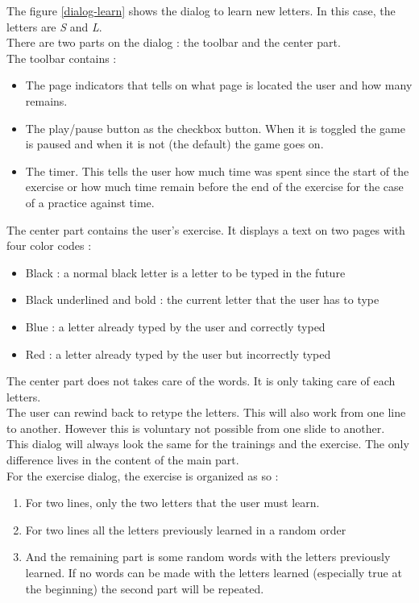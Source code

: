 The figure \ref{dialog-learn} shows the dialog to learn new letters. In this case, the letters are \textit{S} and \textit{L}.\\
There are two parts on the dialog : the toolbar and the center part.\\
The toolbar contains :
\begin{itemize}
	\item The page indicators that tells on what page is located the user and how many remains.
	\item The play/pause button as the checkbox button. When it is toggled the game is paused and when it is not (the default) the game goes on.
	\item The timer. This tells the user how much time was spent since the start of the exercise or how much time remain before the end of the exercise for the case of a practice against time.
\end{itemize}

The center part contains the user's exercise. It displays a text on two pages with four color codes :
\begin{itemize}
	\item Black : a normal black letter is a letter to be typed in the future
	\item Black underlined and bold : the current letter that the user has to type
	\item Blue : a letter already typed by the user and correctly typed
	\item Red  : a letter already typed by the user but incorrectly typed
\end{itemize}

The center part does not takes care of the words. It is only taking care of each letters.\\
The user can rewind back to retype the letters. This will also work from one line to another. However this is voluntary not possible from one slide to another.\\
This dialog will always look the same for the trainings and the exercise. The only difference lives in the content of the main part.\\
For the exercise dialog, the exercise is organized as so :
\begin{enumerate}
	\item For two lines, only the two letters that the user must learn.
	\item For two lines all the letters previously learned in a random order
	\item And the remaining part is some random words with the letters previously learned. If no words can be made with the letters learned (especially true at the beginning) the second part will be repeated.
\end{enumerate}

